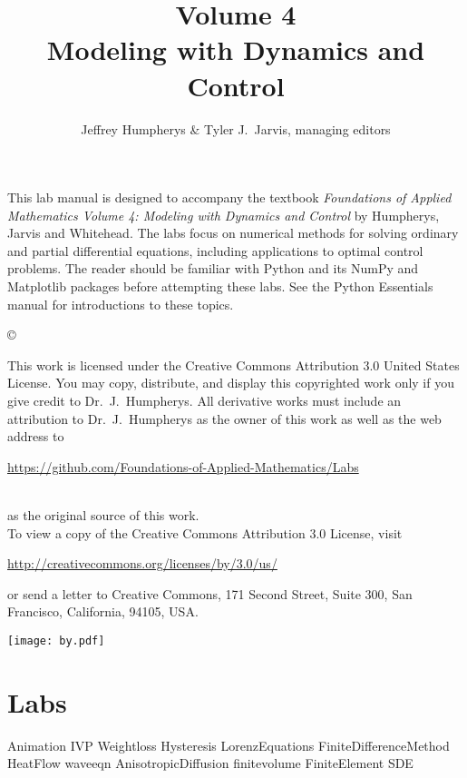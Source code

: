 \documentclass[opener-c,labs,green,nociteref]{HJnewsiambook}
\title{Volume 4\\ Modeling with Dynamics and Control}
\author{Jeffrey Humpherys \& Tyler J.~Jarvis, managing editors}
\begin{document}

\thispagestyle{empty} %
\maketitle
\thispagestyle{empty}
\frontmatter



\begin{thepreface} %

This lab manual is designed to accompany the textbook \emph{Foundations of Applied Mathematics Volume 4: Modeling with Dynamics and Control} by Humpherys, Jarvis and Whitehead.
The labs focus on numerical methods for solving ordinary and partial differential equations, including applications to optimal control problems.
The reader should be familiar with Python \cite{vanrossum2010python} and its NumPy \cite{oliphant2006guide,ascher2001numerical,oliphant2007python} and Matplotlib \cite{Hunter:2007} packages before attempting these labs.
See the Python Essentials manual for introductions to these topics.

\vfill
\copyright{This work is licensed under the Creative Commons Attribution 3.0 United States License.
You may copy, distribute, and display this copyrighted work only if you give credit to Dr.~J.~Humpherys.
All derivative works must include an attribution to Dr.~J.~Humpherys as the owner of this work as well as the web address to
\\
\centerline{\url{https://github.com/Foundations-of-Applied-Mathematics/Labs}}
\\
as the original source of this work.
\\
To view a copy of the Creative Commons Attribution 3.0 License, visit
\\
\centerline{\url{http://creativecommons.org/licenses/by/3.0/us/}}
or send a letter to Creative Commons, 171 Second Street, Suite 300, San Francisco, California, 94105, USA.}

\vfill
\centering\texttt{[image: by.pdf]}
\vfill
\end{thepreface}

\setcounter{tocdepth}{1}
\tableofcontents

\mainmatter %

\part{Labs}
{Animation}
{IVP}
{Weightloss}
{Hysteresis}
{LorenzEquations}
{FiniteDifferenceMethod}
{HeatFlow}
{waveeqn}
{AnisotropicDiffusion}
{finitevolume}
{FiniteElement}
{SDE}
\end{document}
